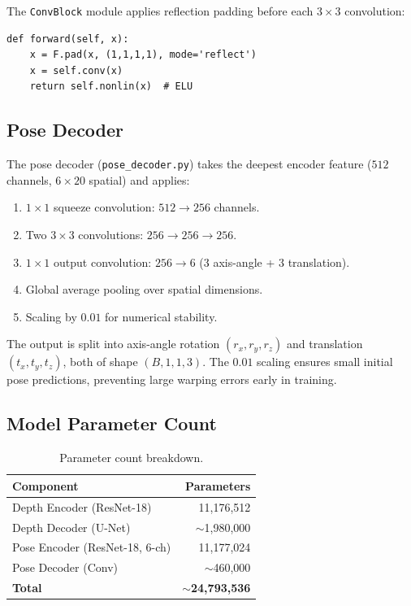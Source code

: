 \documentclass[10pt, a4paper, twocolumn]{article}
\begin{document}
The \texttt{ConvBlock} module applies reflection padding before each $3\times3$ convolution:

\begin{lstlisting}[caption={ConvBlock with reflection padding and ELU.}]
def forward(self, x):
    x = F.pad(x, (1,1,1,1), mode='reflect')
    x = self.conv(x)
    return self.nonlin(x)  # ELU
\end{lstlisting}

\subsection{Pose Decoder}

The pose decoder (\texttt{pose\_decoder.py}) takes the deepest encoder feature ($512$ channels, $6\times20$ spatial) and applies:

\begin{enumerate}[noitemsep]
    \item $1\times1$ squeeze convolution: $512 \to 256$ channels.
    \item Two $3\times3$ convolutions: $256 \to 256 \to 256$.
    \item $1\times1$ output convolution: $256 \to 6$ (3 axis-angle + 3 translation).
    \item Global average pooling over spatial dimensions.
    \item Scaling by $0.01$ for numerical stability.
\end{enumerate}

The output is split into axis-angle rotation $(r_x, r_y, r_z)$ and translation $(t_x, t_y, t_z)$, both of shape $(B, 1, 1, 3)$. The $0.01$ scaling ensures small initial pose predictions, preventing large warping errors early in training.

\subsection{Model Parameter Count}

\begin{table}[H]
\centering
\caption{Parameter count breakdown.}
\label{tab:params}
\begin{tabular}{@{}lr@{}}
\toprule
\textbf{Component} & \textbf{Parameters} \\
\midrule
Depth Encoder (ResNet-18)      & 11,176,512 \\
Depth Decoder (U-Net)          & $\sim$1,980,000 \\
Pose Encoder (ResNet-18, 6-ch) & 11,177,024 \\
Pose Decoder (Conv)            & $\sim$460,000 \\
\midrule
\textbf{Total}                 & $\sim$\textbf{24,793,536} \\
\bottomrule
\end{tabular}
\end{table}
\end{document}
